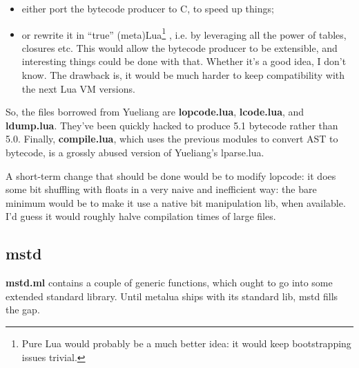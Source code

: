 \begin{itemize}
\item either port the bytecode producer to C, to speed up things;
\item or rewrite it in ``true'' (meta)Lua\footnote{Pure Lua would
    probably be a much better idea: it would keep bootstrapping issues
    trivial.} , i.e. by leveraging all the power of tables, closures
  etc. This would allow the bytecode producer to be extensible, and
  interesting things could be done with that. Whether it's a good
  idea, I don't know. The drawback is, it would be much harder to keep
  compatibility with the next Lua VM versions.
\end{itemize}

So, the files borrowed from Yueliang are {\bf lopcode.lua}, {\bf
  lcode.lua}, and {\bf ldump.lua}. They've been quickly hacked to
produce 5.1 bytecode rather than 5.0. Finally, {\bf compile.lua},
which uses the previous modules to convert AST to bytecode, is a
grossly abused version of Yueliang's lparse.lua.

A short-term change that should be done would be to modify lopcode: it
does some bit shuffling with floats in a very naive and inefficient
way: the bare minimum would be to make it use a native bit
manipulation lib, when available. I'd guess it would roughly halve
compilation times of large files.
 
\subsection{mstd}
{\bf mstd.ml} contains a couple of generic functions, which ought to
go into some extended standard library. Until metalua ships with its
standard lib, mstd fills the gap.